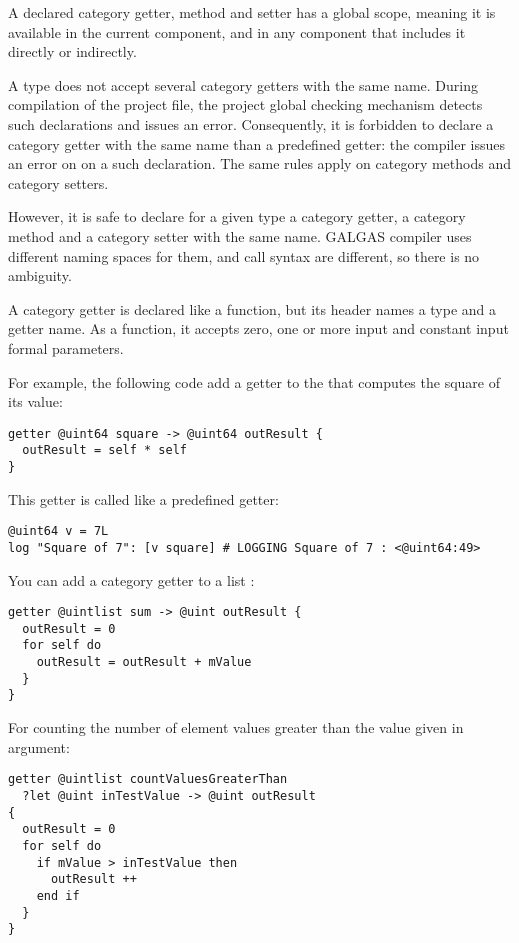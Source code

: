 A declared category getter, method and setter has a global scope, meaning it is available in the current component, and in any component that includes it directly or indirectly.

A type does not accept several category getters with the same name. During compilation of the project file, the project global checking mechanism detects such declarations and issues an error. Consequently, it is forbidden to declare a category getter with the same name than a predefined getter: the compiler issues an error on on a such declaration. The same rules apply on category methods and category setters.

However, it is safe to declare for a given type a category getter, a category method and a category setter with the same name. GALGAS compiler uses different naming spaces for them, and call syntax are different, so there is no ambiguity.











A category getter is declared like a function, but its header names a type and a getter name. As a function, it accepts zero, one or more input and constant input formal parameters.

For example, the following code add a getter to the  that computes the square of its value:
\begin{lstlisting}[language=galgas]
getter @uint64 square -> @uint64 outResult {
  outResult = self * self
}
\end{lstlisting}

This getter is called like a predefined getter:
\begin{lstlisting}[language=galgas]
@uint64 v = 7L
log "Square of 7": [v square] # LOGGING Square of 7 : <@uint64:49>
\end{lstlisting}

You can add a category getter to a list :
\begin{lstlisting}[language=galgas]
getter @uintlist sum -> @uint outResult {
  outResult = 0
  for self do
    outResult = outResult + mValue
  }
}
\end{lstlisting}

For counting the number of element values greater than the value given in argument:
\begin{lstlisting}[language=galgas]
getter @uintlist countValuesGreaterThan
  ?let @uint inTestValue -> @uint outResult
{
  outResult = 0
  for self do
    if mValue > inTestValue then
      outResult ++
    end if
  }
}
\end{lstlisting}

